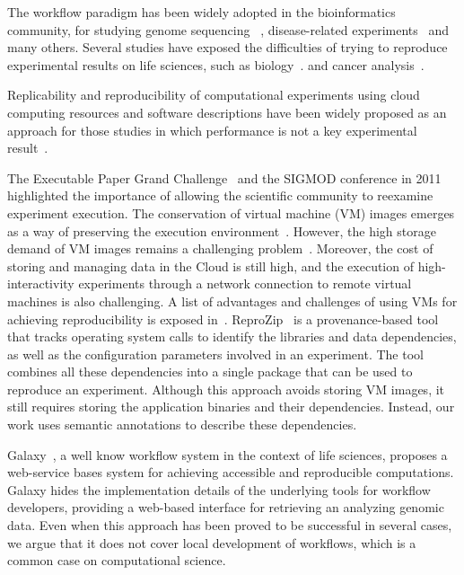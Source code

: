 The workflow paradigm has been widely adopted in the bioinformatics community, for studying genome sequencing ~\cite{blankenberg2010galaxy, giardine2005galaxy, kepler-clotho}, disease-related experiments~\cite{fisher2009systematic, gaizauskas2004} and many others. Several studies have exposed the difficulties of trying to reproduce experimental results on life sciences, such as biology~\cite{Ioannidis2009}. and cancer analysis~\cite{ErringtonCancerRerpoducibility}.

Replicability and reproducibility of computational experiments using cloud computing resources and software descriptions have been widely proposed as an approach for those studies in which performance is not a key experimental result~\cite{Crick14}.

The Executable Paper Grand Challenge~\cite{elsevierchallenge} and the SIGMOD conference in 2011~\cite{SIGMOD} highlighted the importance of allowing the scientific community to reexamine experiment execution. The conservation of virtual machine (VM) images emerges as a way of preserving the execution environment~\cite{Brammer,SHARE}. However, the high storage demand of VM images remains a challenging problem~\cite{Mao:2014:ROD:2600090.2512348,6552826}. Moreover, the cost of storing and managing data in the Cloud is still high, and the execution of high-interactivity experiments through a network connection to remote virtual machines is also challenging. A list of advantages and challenges of using VMs for achieving reproducibility is exposed in~\cite{Howe2012}. ReproZip~\cite{reprozip} is a provenance-based tool that tracks operating system calls to identify the libraries and data dependencies, as well as the configuration parameters involved in an experiment. The tool combines all these dependencies into a single package that can be used to reproduce an experiment. Although this approach avoids storing VM images, it still requires storing the application binaries and their dependencies. Instead, our work uses semantic annotations to describe these dependencies.


Galaxy~\cite{goecks2010galaxy}, a well know workflow system in the context of life sciences, proposes a web-service bases system for achieving accessible and reproducible computations. Galaxy hides the implementation details of the underlying tools for workflow developers, providing a web-based interface for retrieving an analyzing genomic data. Even when this approach has been proved to be successful in several cases, we argue that it does not cover local development of workflows, which is a common case on computational science.  


